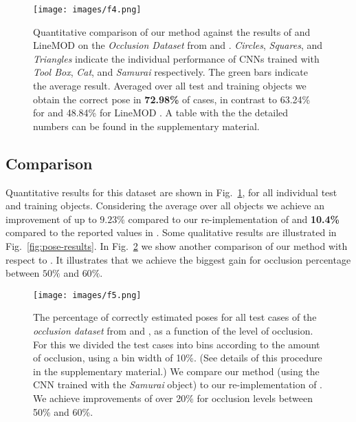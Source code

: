 \documentclass[10pt,letterpaper]{article}
\begin{document}

\begin{figure}[!ht]
\begin{center}
\texttt{[image: images/f4.png]}
\end{center}
   \caption{Quantitative comparison of our method against the results of \cite{brachmann2014} and LineMOD \cite{hinterstoisser2012accv} on the \emph{Occlusion Dataset} from  \cite{brachmann2014} and \cite{hinterstoisser2012accv}. \emph{Circles}, \emph{Squares}, and \emph{Triangles} indicate the individual performance of CNNs trained with \emph{Tool Box}, \emph{Cat}, and \emph{Samurai} respectively. The green bars indicate the average result. Averaged over all test and training objects we obtain the correct pose in {\bf 72.98\%} of cases, in contrast to 63.24\% for \cite{brachmann2014} and 48.84\% for LineMOD \cite{hinterstoisser2012accv}. A table with the the detailed numbers can be found in the supplementary material.}
\label{fig:comp-eccv14}
\end{figure}

\subsection{Comparison}

Quantitative results for this dataset are shown in Fig.~\ref{fig:comp-eccv14}, for all individual test and training objects. Considering the average over all objects we achieve an improvement of up to ${9.23\%}$ compared to our re-implementation of \cite{brachmann2014} and {\bf 10.4\%} compared to the reported values in \cite{brachmann2014}. Some qualitative results are illustrated in Fig.~\ref{fig:pose-results}. In Fig.~\ref{fig:comp-occlusion-eccv14} we show another comparison of our method with respect to \cite{brachmann2014}. It illustrates that we achieve the biggest gain for occlusion percentage between $50\%$ and $60\%$. 

\begin{figure}[t]
\begin{center}
\texttt{[image: images/f5.png]}
\end{center}
   \caption{The percentage of correctly estimated poses for all test cases of the \emph{occlusion dataset} from \cite{brachmann2014} and \cite{hinterstoisser2012accv}, as a function of the level of occlusion. For this we divided the test cases into bins according to the amount of occlusion, using a bin width of 10\%. (See details of this procedure in the supplementary material.) We compare our method (using the CNN trained with the \emph{Samurai} object) to our re-implementation of \cite{brachmann2014}. We achieve improvements of over 20\% for occlusion levels between 50\% and 60\%.}
\label{fig:comp-occlusion-eccv14}
\end{figure}
\end{document}
